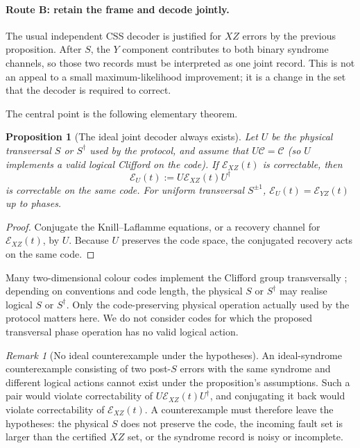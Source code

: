 \documentclass[11pt]{article}
\newtheorem{proposition}[definition]{Proposition}
\theoremstyle{remark}
\newtheorem{remark}[definition]{Remark}
\newcommand{\cC}{\mathcal C}
\newcommand{\cE}{\mathcal E}
\begin{document}
\paragraph{Route B: retain the frame and decode jointly.}
The usual independent CSS decoder is justified for $XZ$ errors by the
previous proposition.  After $S$, the $Y$ component contributes to both
binary syndrome channels, so those two records must be interpreted as one
joint record.  This is not an appeal to a small maximum-likelihood
improvement; it is a change in the set that the decoder is required to
correct.

The central point is the following elementary theorem.

\begin{proposition}[The ideal joint decoder always exists]
Let $U$ be the physical transversal $S$ or $S^\dagger$ used by the protocol,
and assume that $U\cC=\cC$ (so $U$ implements a valid logical Clifford on
the code).  If $\cE_{XZ}(t)$ is correctable, then
\[
 \cE_U(t):=U\cE_{XZ}(t)U^\dagger
 \tag{5}
\]
is correctable on the same code.  For uniform transversal $S^{\pm1}$,
$\cE_U(t)=\cE_{YZ}(t)$ up to phases.
\end{proposition}

\begin{proof}
Conjugate the Knill--Laflamme equations, or a recovery channel for
$\cE_{XZ}(t)$, by $U$.  Because $U$ preserves the code space, the conjugated
recovery acts on the same code.
\end{proof}

Many two-dimensional colour codes implement the Clifford group
transversally \cite{BombinColor}; depending on conventions and code length,
the physical $S$ or $S^\dagger$ may realise logical $S$ or $S^\dagger$.
Only the code-preserving physical operation actually used by the protocol
matters here.  We do not consider codes for which the proposed transversal
phase operation has no valid logical action.

\begin{remark}[No ideal counterexample under the hypotheses]
An ideal-syndrome counterexample consisting of two post-$S$ errors with the
same syndrome and different logical actions cannot exist under the
proposition's assumptions.  Such a pair would violate correctability of
$U\cE_{XZ}(t)U^\dagger$, and conjugating it back would violate
correctability of $\cE_{XZ}(t)$.  A counterexample must therefore leave the
hypotheses: the physical $S$ does not preserve the code, the incoming fault
set is larger than the certified $XZ$ set, or the syndrome record is noisy
or incomplete.
\end{remark}
\end{document}
